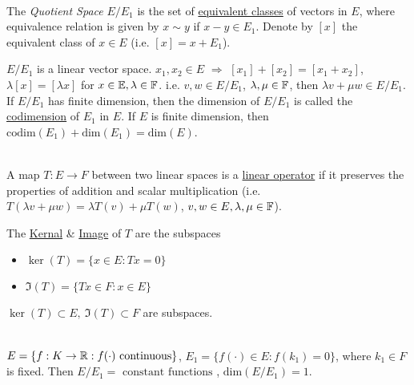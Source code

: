\begin{definition}\ \\
The \textit{Quotient Space} $E / E_1$ is the set of \underline{equivalent classes} of vectors in $E$, where equivalence relation is given by $x \sim y$ if $x- y \in E_1$. Denote by $[x]$ the equivalent class of $x \in E$ (i.e. $[x] = x + E_1$).
\end{definition}

\begin{remark}
$E/E_1$ is a linear vector space. $x_1,x_2 \in E$ $\Rightarrow$ $[x_1] + [x_2] = [x_1 + x_2]$, $\lambda [x] = [\lambda x]$ for $x \in \mathbb{E}, \lambda \in \mathbb{F}$. i.e. $v,w \in E/E_1$, $\lambda,\mu \in \mathbb{F}$, then $\lambda v + \mu w \in E/E_1$. If $E/E_1$ has finite dimension, then the dimension of $E/E_1$ is called the \underline{codimension} of $E_1$ in $E$. If $E$ is finite dimension, then $\text{codim}(E_1) + \text{dim}(E_1) = \text{dim}(E)$.
\end{remark}

\vspace{3pt}
\begin{definition}\ \\
A map $T: E \to F$ between two linear spaces is a \underline{linear operator} if it preserves the properties of addition and scalar multiplication (i.e. $T(\lambda v + \mu w) = \lambda T(v) + \mu T(w)$, $v,w \in E, \lambda,\mu \in \mathbb{F}$).
\end{definition}
\noindent The \underline{Kernal} \& \underline{Image} of $T$ are the subspaces
\begin{itemize}
    \item $\ker(T) = \{x \in E: Tx = 0\}$
    \item $\Im(T) = \{Tx \in F: x \in E\}$
\end{itemize}
$\ker(T) \subset E,\ \Im(T) \subset F$ are subspaces.

\begin{example}\ \\
$E = \{f: K \to \mathbb{R}: f(\cdot) \text{ continuous}\}$, $E_1 = \{f(\cdot) \in E: f(k_1) = 0\}$, where $k_1 \in F$ is fixed. Then $E/E_1 = \text{ constant functions }$, $\text{dim}(E/E_1) = 1$.
\end{example}

\clearpage
